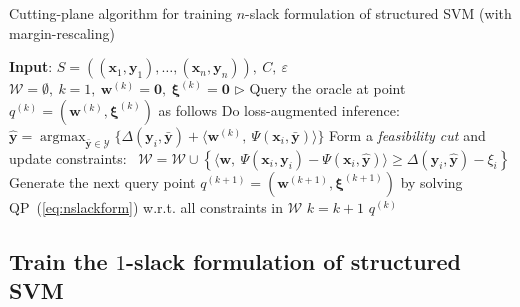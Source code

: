 \documentclass[9pt]{extarticle}
\DeclareMathOperator*{\argmax}{argmax}
\begin{document}
\begin{algorithm}[htbp]
\caption{Cutting-plane algorithm for training $n$-slack formulation of structured SVM (with margin-rescaling)}
\label{alg:nslacktrain}
\begin{algorithmic}[1]
\STATE \textbf{Input}: $S = \left( (\mathbf{x}_1, \mathbf{y}_1), \dots, (\mathbf{x}_n, \mathbf{y}_n) \right),~ C,~ \varepsilon$
\STATE $\mathcal{W} = \emptyset,~ k = 1,~ \mathbf{w}^{(k)} = \mathbf{0},~ \bm{\xi}^{(k)} = \mathbf{0}$
\REPEAT
        \STATE $\triangleright$ Query the oracle at point $q^{(k)} = (\mathbf{w}^{(k)}, \bm{\xi}^{(k)})$ as follows
        \STATE Do loss-augmented inference:~
               $\hat{\mathbf{y}} = \argmax_{\bar{\mathbf{y}} \in \mathcal{Y}} \{ \Delta(\mathbf{y}_i, \bar{\mathbf{y}}) + 
                \langle \mathbf{w}^{(k)},~ \Psi(\mathbf{x}_i, \bar{\mathbf{y}}) \rangle \}$ 
            \STATE Form a \emph{feasibility cut} and update constraints:~
                   $\mathcal{W} = \mathcal{W} \cup 
                    \left\{ \langle \mathbf{w},~ \Psi(\mathbf{x}_i, \mathbf{y}_i) - \Psi(\mathbf{x}_i, \hat{\mathbf{y}}) \rangle \ge 
                    \Delta(\mathbf{y}_i, \hat{\mathbf{y}}) - \xi_i \right\}$ 
            \STATE Generate the next query point $q^{(k+1)} = (\mathbf{w}^{(k+1)}, \bm{\xi}^{(k+1)})$ 
                   by solving QP~(\ref{eq:nslackform}) w.r.t. all constraints in $\mathcal{W}$
            \STATE $k = k+1$
        \ENDIF
    \ENDFOR
\RETURN $q^{(k)}$
\end{algorithmic}
\end{algorithm}


\subsection{Train the $1$-slack formulation of structured SVM}
\label{sec:1slackssvm}
\end{document}
